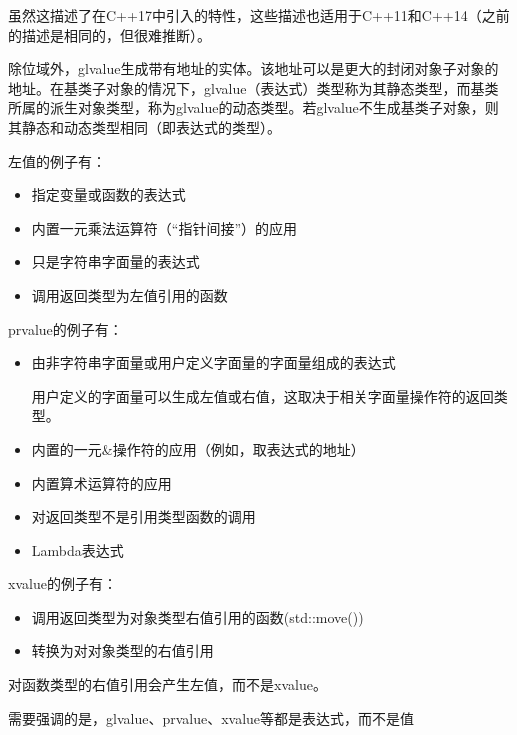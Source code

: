 虽然这描述了在C++17中引入的特性，这些描述也适用于C++11和C++14（之前的描述是相同的，但很难推断）。

除位域外，glvalue生成带有地址的实体。该地址可以是更大的封闭对象子对象的地址。在基类子对象的情况下，glvalue（表达式）类型称为其静态类型，而基类所属的派生对象类型，称为glvalue的动态类型。若glvalue不生成基类子对象，则其静态和动态类型相同（即表达式的类型）。

左值的例子有：

\begin{itemize}
\item 
指定变量或函数的表达式

\item 
内置一元乘法运算符（“指针间接”）的应用

\item 
只是字符串字面量的表达式

\item 
调用返回类型为左值引用的函数
\end{itemize}

prvalue的例子有：

\begin{itemize}
\item 
由非字符串字面量或用户定义字面量的字面量组成的表达式

\begin{notice}
用户定义的字面量可以生成左值或右值，这取决于相关字面量操作符的返回类型。
\end{notice}

\item 
内置的一元\&操作符的应用（例如，取表达式的地址）

\item 
内置算术运算符的应用

\item 
对返回类型不是引用类型函数的调用

\item 
Lambda表达式
\end{itemize}

xvalue的例子有：

\begin{itemize}
\item 
调用返回类型为对象类型右值引用的函数(std::move())

\item 
转换为对对象类型的右值引用
\end{itemize}

对函数类型的右值引用会产生左值，而不是xvalue。

需要强调的是，glvalue、prvalue、xvalue等都是表达式，而不是值

